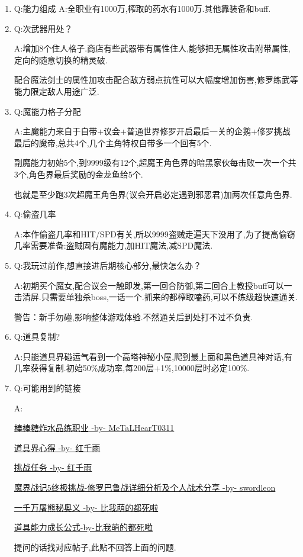 \begin{enumerate}
	\item
	Q:能力组成
	A:全职业有1000万,榨取的药水有1000万.其他靠装备和buff.

	\item
	Q:次武器用处？

	A:增加8个住人格子.商店有些武器带有属性住人,能够把无属性攻击附带属性,定向的随意切换的精灵破.

	配合魔法剑士的属性加攻击配合敌方弱点抗性可以大幅度增加伤害,修罗练武等能力限定敌人用途广泛.

	\item
	Q:魔能力格子分配

	A:主魔能力来自于自带+议会+普通世界修罗开启最后一关的企鹅+修罗挑战最后的魔帝,总共4个,几个主角特权自带多一个回有5个.
	
	副魔能力初始5个,到9999级有12个,超魔王角色界的暗黑家伙每击败一次一个共3个,角色界最后奖励的金龙鱼给5个.

	也就是至少跑3次超魔王角色界(议会开启必定遇到邪恶君)加两次任意角色界.

	\item
	Q:偷盗几率

	A:本作偷盗几率和HIT/SPD有关,所以9999盗贼走遍天下没用了,为了提高偷窃几率需要准备:盗贼固有魔能力,加HIT魔法,减SPD魔法.

	\item
	Q:我玩过前作,想直接进后期核心部分,最快怎么办？

	A:初期买个魔女,配合议会一触即发,第一回合防御,第二回合上教授buff可以一击清屏.只需要单独杀boss,一话一个.抓来的都榨取嗑药,可以不练级超快速通关.

	警告：新手勿碰,影响整体游戏体验.不然通关后到处打不过不负责.

	\item
	Q:道具复制?

	A:只能道具界碰运气看到一个高塔神秘小屋,爬到最上面和黑色道具神对话,有几率获得复制.初始50\%成功率,每200层+1\%,10000层时必定100\%.


	\item
	Q:可能用到的链接

	A:

	\href{http://tieba.baidu.com/p/3717431968}{棒棒糖炸水晶练职业 -by- MeTaLHearT0311}

	\href{http://tieba.baidu.com/p/3730196003}{道具界心得 -by- 红千雨}

	\href{http://tieba.baidu.com/p/3723862919}{挑战任务 -by- 红千雨}

	\href{http://tieba.baidu.com/p/3949061316}{魔界战记5终极挑战-修罗巴鲁战详细分析及个人战术分享 -by- swordleon}

	\href{http://tieba.baidu.com/p/3825275063}{一千万屠熊秘奥义 -by- 比我萌的都死啦}

	\href{http://tieba.baidu.com/f?kz=3834692385}{道具能力成长公式-by-比我萌的都死啦}

	提问的话找对应帖子,此贴不回答上面的问题.

\end{enumerate}


